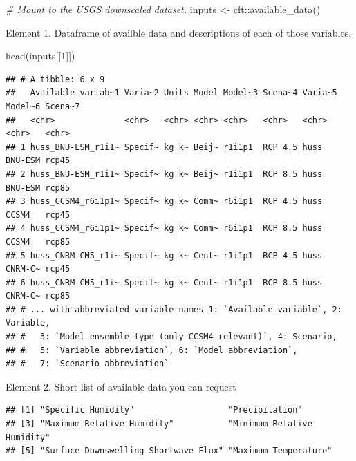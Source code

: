 \documentclass[
  paper=a4,
  ,captions=tableheading
]{scrartcl}
\newenvironment{Shaded}{\begin{snugshade}}{\end{snugshade}}
\newcommand{\CommentTok}[1]{\textcolor[rgb]{0.56,0.35,0.01}{\textit{#1}}}
\newcommand{\DecValTok}[1]{\textcolor[rgb]{0.00,0.00,0.81}{#1}}
\newcommand{\FunctionTok}[1]{\textcolor[rgb]{0.00,0.00,0.00}{#1}}
\newcommand{\NormalTok}[1]{#1}
\newcommand{\OtherTok}[1]{\textcolor[rgb]{0.56,0.35,0.01}{#1}}
\newcommand{\SpecialCharTok}[1]{\textcolor[rgb]{0.00,0.00,0.00}{#1}}
\begin{document}
\begin{Shaded}
\begin{Highlighting}[]
\CommentTok{\# Mount to the USGS downscaled dataset. }
\NormalTok{inputs }\OtherTok{\textless{}{-}}\NormalTok{ cft}\SpecialCharTok{::}\FunctionTok{available\_data}\NormalTok{()}
\end{Highlighting}
\end{Shaded}

Element 1. Dataframe of availble data and descriptions of each of those
variables.

\begin{Shaded}
\begin{Highlighting}[]
\FunctionTok{head}\NormalTok{(inputs[[}\DecValTok{1}\NormalTok{]])}
\end{Highlighting}
\end{Shaded}

\begin{verbatim}
## # A tibble: 6 x 9
##   Available variab~1 Varia~2 Units Model Model~3 Scena~4 Varia~5 Model~6 Scena~7
##   <chr>              <chr>   <chr> <chr> <chr>   <chr>   <chr>   <chr>   <chr>  
## 1 huss_BNU-ESM_r1i1~ Specif~ kg k~ Beij~ r1i1p1  RCP 4.5 huss    BNU-ESM rcp45  
## 2 huss_BNU-ESM_r1i1~ Specif~ kg k~ Beij~ r1i1p1  RCP 8.5 huss    BNU-ESM rcp85  
## 3 huss_CCSM4_r6i1p1~ Specif~ kg k~ Comm~ r6i1p1  RCP 4.5 huss    CCSM4   rcp45  
## 4 huss_CCSM4_r6i1p1~ Specif~ kg k~ Comm~ r6i1p1  RCP 8.5 huss    CCSM4   rcp85  
## 5 huss_CNRM-CM5_r1i~ Specif~ kg k~ Cent~ r1i1p1  RCP 4.5 huss    CNRM-C~ rcp45  
## 6 huss_CNRM-CM5_r1i~ Specif~ kg k~ Cent~ r1i1p1  RCP 8.5 huss    CNRM-C~ rcp85  
## # ... with abbreviated variable names 1: `Available variable`, 2: Variable,
## #   3: `Model ensemble type (only CCSM4 relevant)`, 4: Scenario,
## #   5: `Variable abbreviation`, 6: `Model abbreviation`,
## #   7: `Scenario abbreviation`
\end{verbatim}

Element 2. Short list of available data you can request

\begin{Shaded}
\end{Shaded}

\begin{verbatim}
## [1] "Specific Humidity"                   "Precipitation"                      
## [3] "Maximum Relative Humidity"           "Minimum Relative Humidity"          
## [5] "Surface Downswelling Shortwave Flux" "Maximum Temperature"
\end{verbatim}
\end{document}

